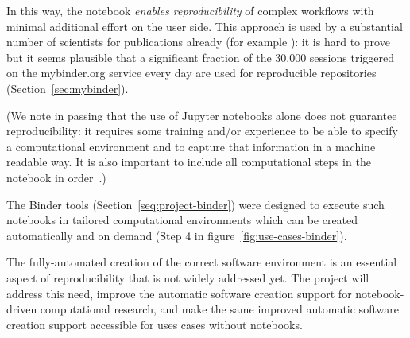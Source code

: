 In this way, the notebook \emph{enables reproducibility} of complex workflows
with minimal additional effort on the user side. This approach is used by a
substantial number of scientists for publications already (for example
\cite{GitHubRepoExampleAlbert2016,GitHubRepoExampleCortes2018,Beg2019-blochpoint-data-repository, }
): it is hard to prove
but it seems plausible that a significant fraction of the 30,000 sessions
triggered on the mybinder.org service every day are used for reproducible repositories
(Section~\ref{sec:mybinder}).

(We note in passing that the use of Jupyter notebooks alone does not guarantee
reproducibility: it requires some training and/or experience to be able to specify a
computational environment and to capture that information in a machine readable
way. It is also important to include all computational steps in the notebook in
order~\cite{Beg2021}.)


The Binder tools (Section~\ref{seq:project-binder}) were designed to execute
such notebooks in tailored computational environments which can be created
automatically and on demand (Step 4 in figure~\ref{fig:use-cases-binder}).

The fully-automated creation of the correct software environment is an
essential aspect of reproducibility that is not widely addressed yet. The
\TheProject{} project will address this need, improve the automatic software creation support
for notebook-driven computational research, and make the same improved automatic
software creation support accessible for uses cases without notebooks.


